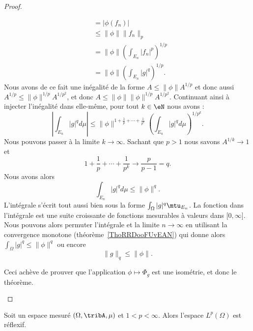 \begin{proof}
\begin{subproof}
\begin{subequations}
\begin{align}
                    &=|\phi(f_n)|\\
                    &\leq \| \phi \|\| f_n \|_p\\
                    &=\| \phi \|\left( \int_{E_n}| f_n |^p \right)^{1/p}\\
                    &=\| \phi \|\left( \int_{E_n}| g |^q \right)^{1/p}.
                \end{align}
            \end{subequations}
            Nous avons de ce fait une inégalité de la forme \( A\leq \| \phi \|A^{1/p}\) et donc aussi \( A^{1/p}\leq \| \phi \|^{1/p}A^{1/p^2}\), et donc \( A\leq \| \phi \|\| \phi \|^{1/p}A^{1/p^2}\). Continuant ainsi à injecter l'inégalité dans elle-même, pour tout \( k\in \eN\) nous avons :
            \begin{equation}
                \left| \int_{E_n}| g |^qd\mu \right| \leq\| \phi \|^{1+\frac{1}{ p }+\cdots+\frac{1}{ p^k }}\left( \int_{E_n}| g |^qd\mu \right)^{1/p^k}.
            \end{equation}
            Nous pouvons passer à la limite \( k\to \infty\). Sachant que \( p>1\) nous savons \( A^{1/k}\to 1\) et
            \begin{equation}
                1+\frac{1}{ p }+\cdots+\frac{1}{ p^k }\to\frac{ p }{ p-1 }=q.
            \end{equation}
            Nous avons alors
            \begin{equation}
                \int_{E_n}| g |^qd\mu\leq \| \phi \|^q.
            \end{equation}
            L'intégrale s'écrit tout aussi bien sous la forme \( \int_{\Omega}| g  |^q\mtu_{E_n}\). La fonction dans l'intégrale est une suite croissante de fonctions mesurables à valeurs dans \( \mathopen[ 0 , \infty \mathclose]\). Nous pouvons alors permuter l'intégrale et la limite \( n\to \infty\) en utilisant la convergence monotone (théorème~\ref{ThoRRDooFUvEAN}) qui donne alors \( \int_{\Omega}| g |^q\leq \| \phi \|^q\) ou encore
            \begin{equation}
                \| g \|_q\leq \| \phi \|.
            \end{equation}

            Ceci achève de prouver que l'application \( \phi\mapsto \Phi_g\) est une isométrie, et donc le théorème.
    \end{subproof}
\end{proof}

\begin{proposition}     \label{PROPooGIOZooBMokXi}
    Soit un espace mesuré \( (\Omega,\tribA,\mu)\) et \( 1<p<\infty\). Alors l'espace \( L^p(\Omega)\) est réflexif.
\end{proposition}

